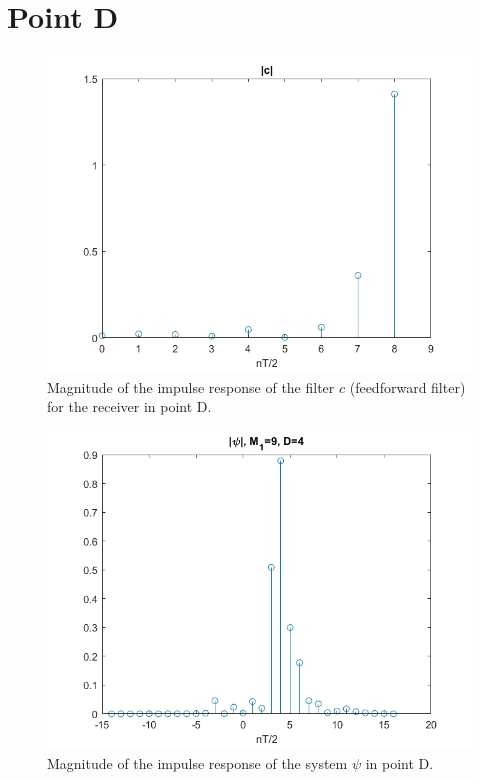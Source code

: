 \documentclass[a4paper,11.5pt]{article}
\begin{document}
\section*{Point D} 









\begin{figure}[ht]
	\begin{center}   
		\includegraphics[width=\textwidth]{figs/D_c.png} 
		\caption{Magnitude of the impulse response of the filter $c$ (feedforward filter) for the receiver in point D.}
		\label{fig:D_c}
	\end{center}
\end{figure}

\begin{figure}[ht]
	\begin{center}   
		\includegraphics[width=\textwidth]{figs/D_psi.png} 
		\caption{Magnitude of the impulse response of the system $\psi$ in point D.}
		\label{fig:D_psi}
	\end{center}
\end{figure}
\end{document}
